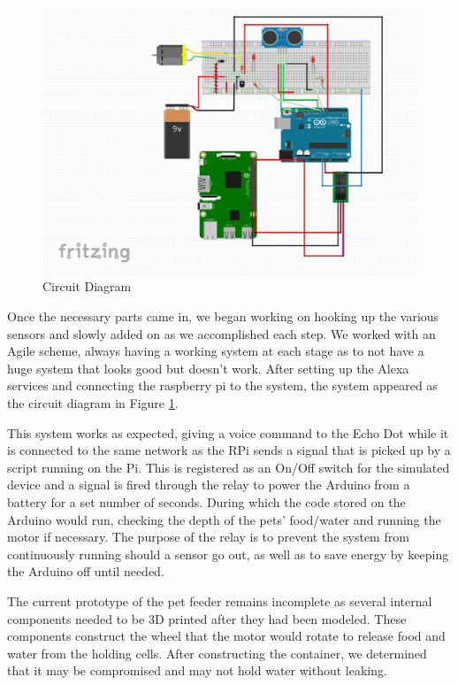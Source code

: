 \documentclass[notitlepage,11pt]{article}
\begin{document}
        \begin{figure}[!htb]
            \centering
            \includegraphics[width=\textwidth]{images/circuit.png}
            \caption{Circuit Diagram}
            \label{fig:circuit}
        \end{figure}

        Once the necessary parts came in, we began working on hooking up the various sensors and slowly added on as we 
        accomplished each step. We worked with an Agile scheme, always having a working system at each stage as to not have 
        a huge system that looks good but doesn't work. After setting up the Alexa services and connecting the raspberry 
        pi to the system, the system appeared as the circuit diagram in Figure \ref{fig:circuit}.

        

        This system works as expected, giving a voice command to the Echo Dot while it is connected to the same network 
        as the RPi sends a signal that is picked up by a script running on the Pi. This is registered as an On/Off switch 
        for the simulated device and a signal is fired through the relay to power the Arduino from a battery for a 
        set number of seconds. During which the code stored on the Arduino would run, checking the depth of the pets' 
        food/water and running the motor if necessary. The purpose of the relay is to prevent the system from continuously 
        running should a sensor go out, as well as to save energy by keeping the Arduino off until needed.
        
        The current prototype of the pet feeder remains incomplete as several internal components needed to be 3D 
        printed after they had been modeled. These components construct the wheel that the motor would rotate to release 
        food and water from the holding cells. After constructing the container, we determined that it may be compromised
        and may not hold water without leaking. 
\end{document}
